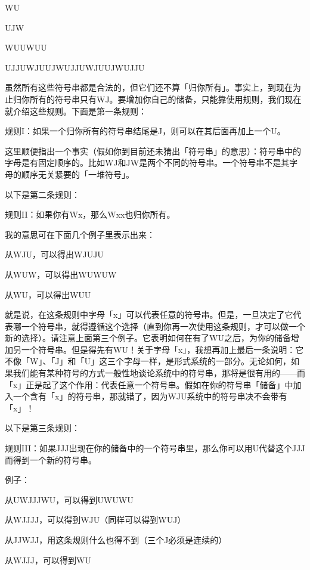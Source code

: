 \documentclass[
  12pt,
  twoside,
  openright,
  oldfontcommands,
]{memoir}
\renewenvironment{quote}
  {\begin{mdframed}[style=gebquote]\small}
  {\end{mdframed}}
\begin{document}
\begin{quote}
WU

UJW

WUUWUU

UJJUWJUUJWUJJUWJUUJWUJJU
\end{quote}

虽然所有这些符号串都是合法的，但它们还不算「归你所有」。事实上，到现在为止归你所有的符号串只有WJ。要增加你自己的储备，只能靠使用规则，我们现在就介绍这些规则。下面是第一条规则：

规则I：如果一个归你所有的符号串结尾是J，则可以在其后面再加上一个U。

这里顺便指出一个事实（假如你到目前还未猜出「符号串」的意思）：符号串中的字母是有固定顺序的。比如WJ和JW是两个不同的符号串。一个符号串不是其字母的顺序无关紧要的「一堆符号」。

以下是第二条规则：

规则II：如果你有Wx，那么Wxx也归你所有。

我的意思可在下面几个例子里表示出来：

\begin{quote}
从WJU，可以得出WJUJU

从WUW，可以得出WUWUW

从WU，可以得出WUU
\end{quote}

就是说，在这条规则中字母「x」可以代表任意的符号串。但是，一旦决定了它代表哪一个符号串，就得遵循这个选择（直到你再一次使用这条规则，才可以做一个新的选择）。请注意上面第三个例子。它表明如何在有了WU之后，为你的储备增加另一个符号串。但是得先有WU！关于字母「x」，我想再加上最后一条说明：它不像「W」、「J」和「U」这三个字母一样，是形式系统的一部分。无论如何，如果我们能有某种符号的方式一般性地谈论系统中的符号串，那将是很有用的------而「x」正是起了这个作用：代表任意一个符号串。假如在你的符号串「储备」中加入一个含有「x」的符号串，那就错了，因为WJU系统中的符号串决不会带有「x」！

以下是第三条规则：

规则III：如果JJJ出现在你的储备中的一个符号串里，那么你可以用U代替这个JJJ而得到一个新的符号串。

例子：

\begin{quote}
从UWJJJWU，可以得到UWUWU

从WJJJJ，可以得到WJU（同样可以得到WUJ）

从JJWJJ，用这条规则什么也得不到（三个J必须是连续的）

从WJJJ，可以得到WU
\end{quote}
\end{document}
